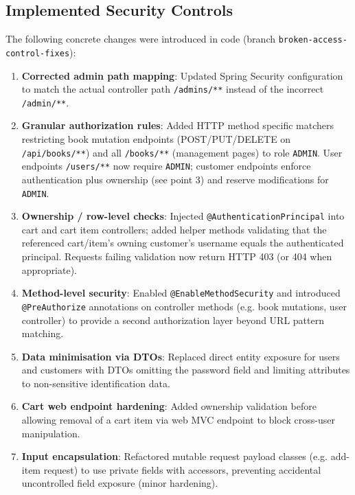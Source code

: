 \documentclass[]{UCD_CS_FYP_Report}
\begin{document}
\subsection*{Implemented Security Controls}
The following concrete changes were introduced in code (branch \texttt{broken-access-control-fixes}):
\begin{enumerate}
	\item \textbf{Corrected admin path mapping}: Updated Spring Security configuration to match the actual controller path \texttt{/admins/**} instead of the incorrect \texttt{/admin/**}.
	\item \textbf{Granular authorization rules}: Added HTTP method specific matchers restricting book mutation endpoints (POST/PUT/DELETE on \texttt{/api/books/**}) and all \texttt{/books/**} (management pages) to role \texttt{ADMIN}. User endpoints \texttt{/users/**} now require \texttt{ADMIN}; customer endpoints enforce authentication plus ownership (see point 3) and reserve modifications for \texttt{ADMIN}.
	\item \textbf{Ownership / row-level checks}: Injected \texttt{@AuthenticationPrincipal} into cart and cart item controllers; added helper methods validating that the referenced cart/item's owning customer's username equals the authenticated principal. Requests failing validation now return HTTP 403 (or 404 when appropriate).
	\item \textbf{Method-level security}: Enabled \texttt{@EnableMethodSecurity} and introduced \texttt{@PreAuthorize} annotations on controller methods (e.g. book mutations, user controller) to provide a second authorization layer beyond URL pattern matching.
	\item \textbf{Data minimisation via DTOs}: Replaced direct entity exposure for users and customers with DTOs omitting the password field and limiting attributes to non-sensitive identification data.
	\item \textbf{Cart web endpoint hardening}: Added ownership validation before allowing removal of a cart item via web MVC endpoint to block cross-user manipulation.
	\item \textbf{Input encapsulation}: Refactored mutable request payload classes (e.g. add-item request) to use private fields with accessors, preventing accidental uncontrolled field exposure (minor hardening).
\end{enumerate}
\end{document}
